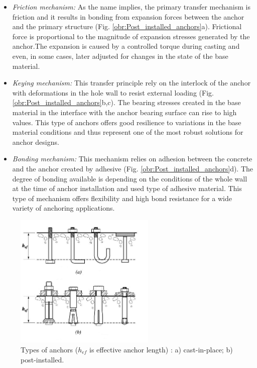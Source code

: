 \begin{itemize}
	\item \textit{Friction mechanism:}	
	As the name implies, the primary transfer mechanism is friction and it results in bonding from expansion forces between the anchor and the primary structure (Fig. \ref{obr:Post_installed_anchors}a). Frictional force is proportional to the magnitude of expansion stresses generated by the anchor.The expansion is caused by a controlled torque during casting and even, in some cases, later adjusted for changes in the state of the base material.
	
	\item \textit{Keying mechanism:}	
	This transfer principle rely on the interlock of the anchor with deformations in the hole wall to resist external loading (Fig. \ref{obr:Post_installed_anchors}b,c). The bearing stresses created in the base material in the interface with the anchor bearing surface can rise to high values. This type of anchors offers good resilience to variations in the base material conditions and thus represent one of the most robust solutions for anchor designs. 
	
	\item \textit{Bonding mechanism:}	
	This mechanism relies on adhesion between the concrete and the anchor created by adhesive (Fig. \ref{obr:Post_installed_anchors}d). The degree of bonding available is depending on the conditions of the whole wall at the time of anchor installation and used type of adhesive material. This type of mechanism offers flexibility and high bond resistance for a wide variety of anchoring applications. 
\end{itemize}

\begin{figure}[h!] 
	\centering 
	\includegraphics[width=0.6\textwidth]{obrazky/anchor_types_repaired.png} 
	\caption[Types of anchors]{Types of anchors ($h_{ef}$ is effective anchor length) \cite{anchors-ACI-318M}: a) cast-in-place; b) post-installed.}\label{obr:Anchors} 
\end{figure} 


